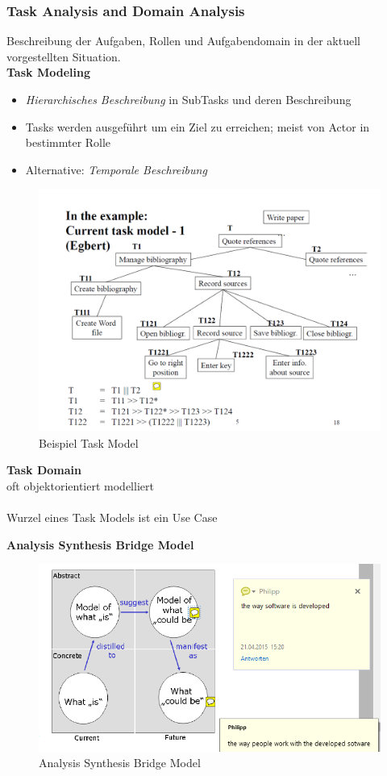 \subsubsection{Task Analysis and Domain Analysis}
Beschreibung der Aufgaben, Rollen und Aufgabendomain in der aktuell vorgestellten Situation.\\
\textbf{Task Modeling}
\begin{itemize}
	\item \textit{Hierarchisches Beschreibung} in  SubTasks und deren Beschreibung
	\item Tasks werden ausgeführt um ein Ziel zu erreichen; meist von Actor in bestimmter Rolle
	\item Alternative: \textit{Temporale Beschreibung} 
\end{itemize}
\begin{figure}[!h]
	\centering
	\includegraphics[scale=0.3]{img/task_model_ex.png}
	\caption{Beispiel Task Model}
\end{figure}
\textbf{Task Domain}\\
oft objektorientiert modelliert\\
\\
Wurzel eines Task Models ist ein Use Case

\newpage
\textbf{Analysis Synthesis Bridge Model}
\begin{figure}[!h]
	\centering
	\includegraphics[scale=0.6]{img/analysis_synthesis_bridge_model.png}
	\caption{Analysis Synthesis Bridge Model}
\end{figure}


